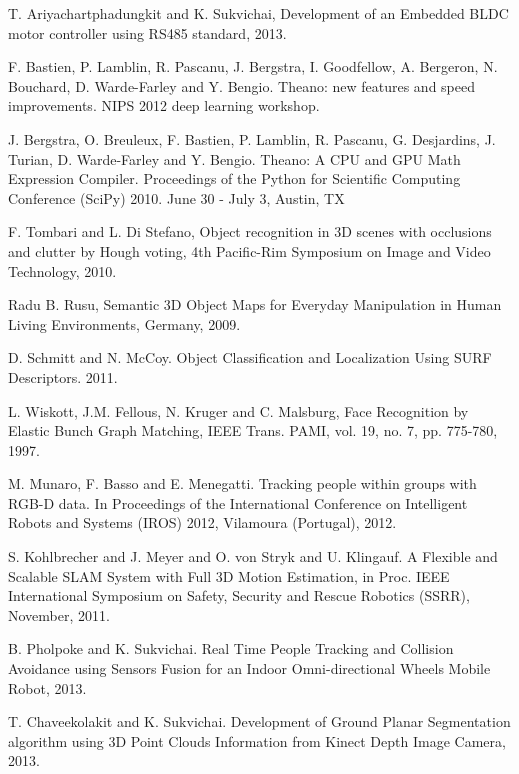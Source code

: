 \documentclass{llncs}
\begin{document}
\begin{thebibliography}{4}

 T. Ariyachartphadungkit and K. Sukvichai, Development of an Embedded BLDC motor controller using RS485 standard, 2013.

F. Bastien, P. Lamblin, R. Pascanu, J. Bergstra, I. Goodfellow, A. Bergeron, N. Bouchard, D. Warde-Farley and Y. Bengio. Theano: new features and speed improvements. NIPS 2012 deep learning workshop.

J. Bergstra, O. Breuleux, F. Bastien, P. Lamblin, R. Pascanu, G. Desjardins, J. Turian, D. Warde-Farley and Y. Bengio. Theano: A CPU and GPU Math Expression Compiler. Proceedings of the Python for Scientific Computing Conference (SciPy) 2010. June 30 - July 3, Austin, TX

F. Tombari and L. Di Stefano, Object recognition in 3D scenes with occlusions and clutter by Hough voting, 4th Pacific-Rim Symposium on Image and Video Technology, 2010.

 Radu B. Rusu, 
Semantic 3D Object Maps for Everyday Manipulation in Human Living Environments, Germany, 2009.

 D. Schmitt and N. McCoy. Object Classification and Localization Using SURF Descriptors. 2011.

 L. Wiskott, J.M. Fellous, N. Kruger and C. Malsburg, Face Recognition by Elastic Bunch Graph Matching, IEEE Trans. PAMI, vol. 19, no. 7, pp. 775-780, 1997. 

 M. Munaro, F. Basso and E. Menegatti. Tracking people within groups with RGB-D data. In Proceedings of the International Conference on Intelligent Robots and Systems (IROS) 2012, Vilamoura (Portugal), 2012.

 S. Kohlbrecher and J. Meyer and O. von Stryk and U. Klingauf. A Flexible and Scalable SLAM System with Full 3D Motion Estimation, in Proc. IEEE International Symposium on Safety, Security and Rescue Robotics (SSRR), November, 2011.

 B. Pholpoke and K. Sukvichai. Real Time People Tracking and Collision Avoidance using Sensors Fusion for an Indoor Omni-directional Wheels Mobile Robot, 2013.

 T. Chaveekolakit and K. Sukvichai. Development of Ground Planar Segmentation algorithm using 3D Point Clouds Information from Kinect Depth Image Camera, 2013.

\end{thebibliography}
\end{document}
